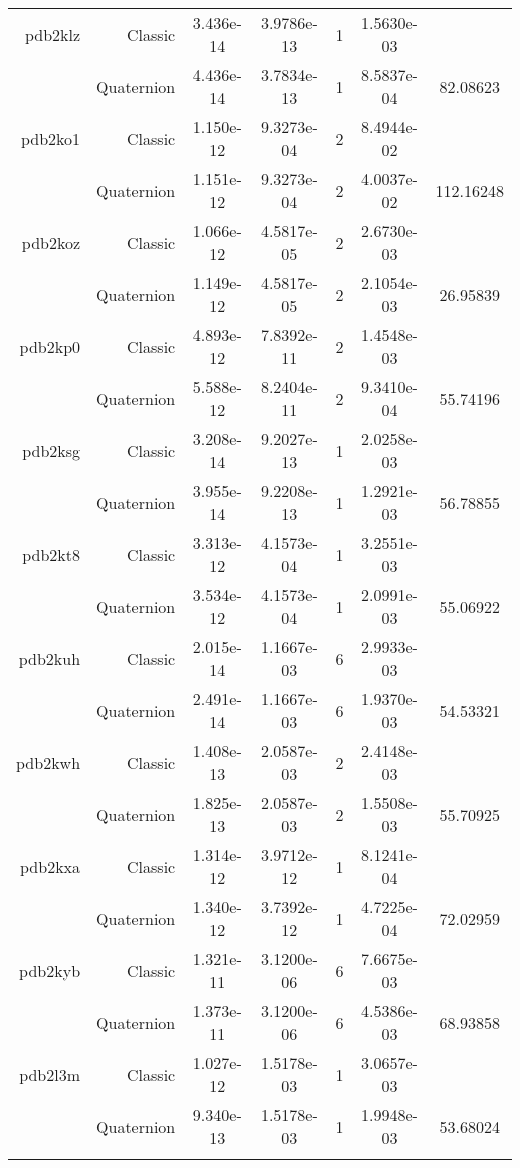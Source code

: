 \begin{xltabular}{\textwidth}{r|rS[table-format=1.3e+2]S[table-format=1.4e+2]cS[table-format=1.4e+2]S[table-format=-1.5]}
pdb2klz & Classic & 3.436e-14 & 3.9786e-13 & 1 & 1.5630e-03 & \\
& Quaternion & 4.436e-14 & 3.7834e-13 & 1 & 8.5837e-04 & 82.08623\\  \addlinespace
pdb2ko1 & Classic & 1.150e-12 & 9.3273e-04 & 2 & 8.4944e-02 & \\
& Quaternion & 1.151e-12 & 9.3273e-04 & 2 & 4.0037e-02 & 112.16248\\  \addlinespace
pdb2koz & Classic & 1.066e-12 & 4.5817e-05 & 2 & 2.6730e-03 & \\
& Quaternion & 1.149e-12 & 4.5817e-05 & 2 & 2.1054e-03 & 26.95839\\  \addlinespace
pdb2kp0 & Classic & 4.893e-12 & 7.8392e-11 & 2 & 1.4548e-03 & \\
& Quaternion & 5.588e-12 & 8.2404e-11 & 2 & 9.3410e-04 & 55.74196\\  \addlinespace
pdb2ksg & Classic & 3.208e-14 & 9.2027e-13 & 1 & 2.0258e-03 & \\
& Quaternion & 3.955e-14 & 9.2208e-13 & 1 & 1.2921e-03 & 56.78855\\  \addlinespace
pdb2kt8 & Classic & 3.313e-12 & 4.1573e-04 & 1 & 3.2551e-03 & \\
& Quaternion & 3.534e-12 & 4.1573e-04 & 1 & 2.0991e-03 & 55.06922\\  \addlinespace
pdb2kuh & Classic & 2.015e-14 & 1.1667e-03 & 6 & 2.9933e-03 & \\
& Quaternion & 2.491e-14 & 1.1667e-03 & 6 & 1.9370e-03 & 54.53321\\  \addlinespace
pdb2kwh & Classic & 1.408e-13 & 2.0587e-03 & 2 & 2.4148e-03 & \\
& Quaternion & 1.825e-13 & 2.0587e-03 & 2 & 1.5508e-03 & 55.70925\\  \addlinespace
pdb2kxa & Classic & 1.314e-12 & 3.9712e-12 & 1 & 8.1241e-04 & \\
& Quaternion & 1.340e-12 & 3.7392e-12 & 1 & 4.7225e-04 & 72.02959\\  \addlinespace
pdb2kyb & Classic & 1.321e-11 & 3.1200e-06 & 6 & 7.6675e-03 & \\
& Quaternion & 1.373e-11 & 3.1200e-06 & 6 & 4.5386e-03 & 68.93858\\  \addlinespace
pdb2l3m & Classic & 1.027e-12 & 1.5178e-03 & 1 & 3.0657e-03 & \\
& Quaternion & 9.340e-13 & 1.5178e-03 & 1 & 1.9948e-03 & 53.68024\\  \addlinespace

\end{xltabular}
